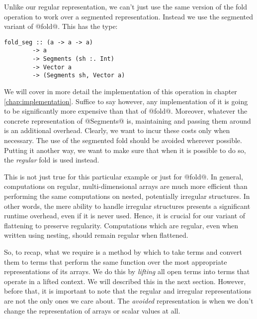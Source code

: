 Unlike our regular representation, we can't just use the same version of the fold operation to work over a segmented representation. Instead we use the segmented variant of @fold@. This has the type:
%
\begin{lstlisting}[style=ndp]
fold_seg :: (a -> a -> a)
        -> a
        -> Segments (sh :. Int)
        -> Vector a
        -> (Segments sh, Vector a)
\end{lstlisting}
%
We will cover in more detail the implementation of this operation in chapter \ref{chap:implementation}. Suffice to say however, any implementation of it is going to be significantly more expensive than that of @fold@. Moreover, whatever the concrete representation of @Segments@ is, maintaining and passing them around is an additional overhead. Clearly, we want to incur these costs only when necessary. The use of the segmented fold should be avoided wherever possible. Putting it another way, we want to make sure that when it is possible to do so, the \emph{regular} fold is used instead.

This is not just true for this particular example or just for @fold@. In general, computations on regular, multi-dimensional arrays are much more efficient than performing the same computations on nested, potentially irregular structures. In other words, the mere ability to handle irregular structures presents a significant runtime overhead, even if it is never used. Hence, it is crucial for our variant of flattening to preserve regularity. Computations which are regular, even when written using nesting, should remain regular when flattened.

So, to recap, what we require is a method by which to take \ndp{} terms and convert them to terms that perform the same function over the most appropriate representations of its arrays. We do this by \emph{lifting} all open terms into terms that operate in a lifted context. We will described this in the next section. However, before that, it is important to note that the regular and irregular representations are not the only ones we care about. The \emph{avoided} representation is when we don't change the representation of arrays or scalar values at all.

